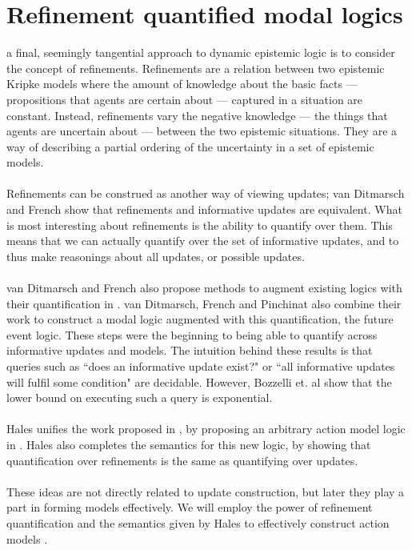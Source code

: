 \section{Refinement quantified modal logics} \label{section:refineModalLogics}

a final, seemingly tangential approach to dynamic epistemic logic is to consider the concept of refinements.
Refinements are a relation between two epistemic Kripke models where the amount of knowledge about
the basic facts --- propositions that agents are certain about --- captured in a situation are constant.
Instead, refinements vary the negative knowledge --- the things that agents are uncertain about ---
between the two epistemic situations.
They are a way of describing a partial ordering of the uncertainty in a set of epistemic models.\\
\\
Refinements can be construed as another way of viewing updates; van Ditmarsch and French \cite{van2009simulation} show
that refinements and informative updates are equivalent.
What is most interesting about refinements is the ability to quantify over them.
This means that we can actually quantify over the set of informative updates, and to thus make
reasonings about all updates, or possible updates.\\
\\
van Ditmarsch and French also propose methods to augment existing logics with their quantification
in \cite{van2009simulation}.
van Ditmarsch, French and Pinchinat \cite{van2010future} also combine their work to construct a modal logic augmented
with this quantification, the future event logic.
These steps were the beginning to being able to quantify across informative updates and models.
The intuition behind these results is that queries such as ``does an informative update exist?" or
``all informative updates will fulfil some condition" are decidable.
However, Bozzelli et. al \cite{refineModalComplexity} show that the lower bound on executing such a query is exponential. \\
\\
Hales unifies the work proposed in \cite{van2009simulation}, by proposing an arbitrary action model
logic in \cite{hales13synthesis}.
Hales also completes the semantics for this new logic, by showing that quantification over
refinements is the same as quantifying over updates.\\
\\
These ideas are not directly related to update construction, but later they play a part in forming
models effectively.
We will employ the power of refinement quantification and the semantics given by Hales to
effectively construct action models \cite{hales13synthesis}.

